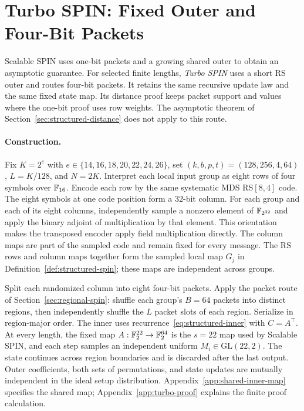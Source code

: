 \section{Turbo SPIN: Fixed Outer and Four-Bit Packets}
\label{sec:turbo-spin}

Scalable SPIN uses one-bit packets and a growing shared outer to obtain
an asymptotic guarantee. For selected finite lengths, \emph{Turbo SPIN}
uses a short RS outer and routes four-bit packets. It retains the same
recursive update law and the same fixed state map. Its distance proof
keeps packet support and values where the one-bit proof uses row
weights. The asymptotic theorem of Section~\ref{sec:structured-distance}
does not apply to this route.

\paragraph{Construction.}
Fix $K=2^e$ with $e\in\{14,16,18,20,22,24,26\}$, set
$(k,b,p,t)=(128,256,4,64)$, $L=K/128$, and $N=2K$. Interpret each local
input group as eight rows of four
symbols over $\mathbb F_{16}$. Encode each row by the same systematic MDS
RS$[8,4]$ code. The eight symbols at one code position form a $32$-bit
column. For each group and each of its eight columns, independently sample
a nonzero element of $\mathbb F_{2^{32}}$ and apply the binary adjoint of
multiplication by that element. This orientation makes the transposed
encoder apply field multiplication directly. The column maps are part of
the sampled code and remain fixed for every message.
The RS rows and column maps together form the sampled local map $G_j$
in Definition~\ref{def:structured-spin}; these maps are independent
across groups.

Split each randomized column into eight four-bit packets. Apply the
packet route of Section~\ref{sec:regional-spin}: shuffle each group's
$B=64$ packets into distinct regions, then independently shuffle the $L$
packet slots of each region. Serialize in region-major order.
The inner uses recurrence~\eqref{eq:structured-inner} with $C=A^\top$.
At every length, the fixed map $A:\mathbb F_2^{22}\to\mathbb F_2^{64}$ is the $s=22$
map used by Scalable SPIN, and each step samples an independent uniform
$M_i\in\mathrm{GL}(22,2)$.
The state continues across region boundaries and is discarded after
the last output. Outer coefficients, both sets of
permutations, and state updates are mutually independent in the ideal
setup distribution. Appendix~\ref{app:shared-inner-map} specifies the
shared map; Appendix~\ref{app:turbo-proof} explains the finite proof
calculation.

